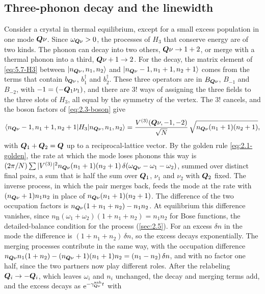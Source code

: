 \subsection{Three-phonon decay and the linewidth}

Consider a crystal in thermal equilibrium, except for a small excess population in one mode $\bm{Q}\nu$. Since $\omega_{\bm{Q}\nu} > 0$, the processes of $H_3$ that conserve energy are of two kinds. The phonon can decay into two others, $\bm{Q}\nu \to 1 + 2$, or merge with a thermal phonon into a third, $\bm{Q}\nu + 1 \to 2$. For the decay, the matrix element of \cref{eq:5.7-H3} between $|n_{\bm{Q}\nu}, n_1, n_2\rangle$ and $|n_{\bm{Q}\nu} - 1, n_1 + 1, n_2 + 1\rangle$ comes from the terms that contain $b_{\bm{Q}\nu}$, $b^\dagger_1$ and $b^\dagger_2$. These three operators are in $B_{\bm{Q}\nu}$, $B_{-1}$ and $B_{-2}$, with $-1 = (-\bm{Q}_1\nu_1)$, and there are $3!$ ways of assigning the three fields to the three slots of $H_3$, all equal by the symmetry of the vertex. The $3!$ cancels, and the boson factors of \cref{eq:2.3-boson} give
\begin{equation*}
  \langle n_{\bm{Q}\nu} - 1, n_1 + 1, n_2 + 1|H_3|n_{\bm{Q}\nu}, n_1, n_2\rangle = \frac{V^{(3)}(\bm{Q}\nu,-1,-2)}{\sqrt N}\,\sqrt{n_{\bm{Q}\nu}(n_1 + 1)(n_2 + 1)} ,
\end{equation*}
with $\bm{Q}_1 + \bm{Q}_2 = \bm{Q}$ up to a reciprocal-lattice vector. By the golden rule \cref{eq:2.1-golden}, the rate at which the mode loses phonons this way is $(2\pi/N)\sum|V^{(3)}|^2n_{\bm{Q}\nu}(n_1 + 1)(n_2 + 1)\,\delta(\omega_{\bm{Q}\nu} - \omega_1 - \omega_2)$, summed over distinct final pairs, a sum that is half the sum over $\bm{Q}_1$, $\nu_1$ and $\nu_2$ with $\bm{Q}_2$ fixed. The inverse process, in which the pair merges back, feeds the mode at the rate with $(n_{\bm{Q}\nu} + 1)n_1n_2$ in place of $n_{\bm{Q}\nu}(n_1 + 1)(n_2 + 1)$. The difference of the two occupation factors is $n_{\bm{Q}\nu}(1 + n_1 + n_2) - n_1n_2$. At equilibrium this difference vanishes, since $n_{\mathrm{B}}(\omega_1 + \omega_2)(1 + n_1 + n_2) = n_1n_2$ for Bose functions, the detailed-balance condition for the process (\cref{sec:2.5}). For an excess $\delta n$ in the mode the difference is $(1 + n_1 + n_2)\,\delta n$, so the excess decays exponentially. The merging processes contribute in the same way, with the occupation difference $n_{\bm{Q}\nu}n_1(1 + n_2) - (n_{\bm{Q}\nu} + 1)(n_1 + 1)n_2 = (n_1 - n_2)\,\delta n$, and with no factor one half, since the two partners now play different roles. After the relabeling $\bm{Q}_i \to -\bm{Q}_i$, which leaves $\omega_i$ and $n_i$ unchanged, the decay and merging terms add, and the excess decays as $\mathrm{e}^{-\gamma^{\mathrm{anh}}_{\bm{Q}\nu}t}$ with
